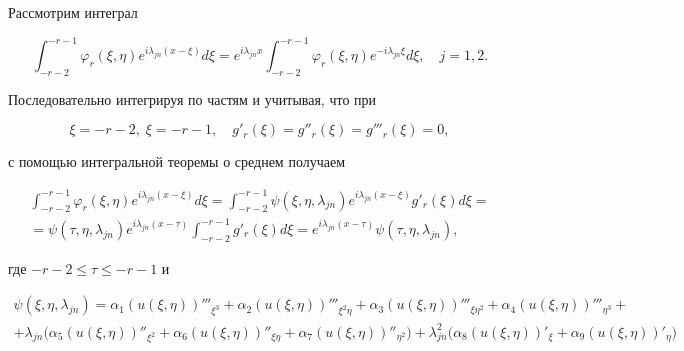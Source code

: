  


\begin{pf} Рассмотрим интеграл 


$$ 


\int^{-r-1}_{-r-2}\varphi_r(\xi,\eta)e^{i\lambda_{jn}(x-\xi)}d\xi= 


e^{i\lambda_{jn}x}\int^{-r-1}_{-r-2}\varphi_r(\xi,\eta) 


e^{-i\lambda_{jn}\xi}d\xi,\quad j=1,2. 


$$ 


Последовательно интегрируя по частям и учитывая, что при 


$$


\xi=-r-2,\;\xi=-r-1, \quad g'_r(\xi)=g''_r(\xi)=g'''_r(\xi)=0,


$$


с помощью интегральной теоремы о среднем получаем 


\begin{multline} 


\int^{-r-1}_{-r-2}\varphi_r(\xi,\eta)e^{i\lambda_{jn}(x-\xi)}d\xi= 


\int^{-r-1}_{-r-2}\psi(\xi,\eta,\lambda_{jn})e^{i\lambda_{jn}(x-\xi)} 


g'_r(\xi)d\xi = \\ 


=\psi(\tau,\eta,\lambda_{jn})e^{i\lambda_{jn}(x-\tau)} 


\int^{-r-1}_{-r-2}g'_r(\xi)d\xi = e^{i\lambda_{jn}(x-\tau)}\psi 


(\tau,\eta,\lambda_{jn}), 


\end{multline} 


где $-r-2\le\tau\le -r-1$ и 


\begin{gather*} 


\psi(\xi,\eta,\lambda_{jn})=\alpha_1(u(\xi,\eta))'''_{\xi^3}+ 


\alpha_2(u(\xi,\eta))'''_{\xi^2\eta}+\alpha_3(u(\xi,\eta))'''_{\xi\eta^2}+ 


\alpha_4(u(\xi,\eta))'''_{\eta^3} + \\ 


%


+\lambda_{jn}\bigl(\alpha_5(u(\xi,\eta))''_{\xi^2} 


+\alpha_6(u(\xi,\eta))''_{\xi\eta}+\alpha_7(u(\xi,\eta))''_{\eta^2}\bigr) 


+\lambda^2_{jn}\bigl(\alpha_8(u(\xi,\eta))'_\xi 


+\alpha_9(u(\xi,\eta))'_\eta\bigr) 



\end{gather*}
\end{pf}
